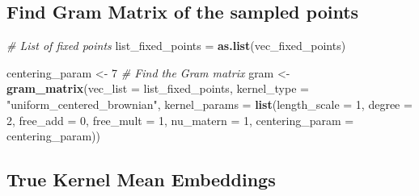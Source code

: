\documentclass[
]{article}
\newenvironment{Shaded}{\begin{snugshade}}{\end{snugshade}}
\newcommand{\AttributeTok}[1]{\textcolor[rgb]{0.13,0.29,0.53}{#1}}
\newcommand{\CommentTok}[1]{\textcolor[rgb]{0.56,0.35,0.01}{\textit{#1}}}
\newcommand{\DecValTok}[1]{\textcolor[rgb]{0.00,0.00,0.81}{#1}}
\newcommand{\FunctionTok}[1]{\textcolor[rgb]{0.13,0.29,0.53}{\textbf{#1}}}
\newcommand{\NormalTok}[1]{#1}
\newcommand{\OtherTok}[1]{\textcolor[rgb]{0.56,0.35,0.01}{#1}}
\newcommand{\StringTok}[1]{\textcolor[rgb]{0.31,0.60,0.02}{#1}}
\begin{document}
\subsection{Find Gram Matrix of the sampled
points}\label{find-gram-matrix-of-the-sampled-points}

\begin{Shaded}
\begin{Highlighting}[]
\CommentTok{\# List of fixed points}
\NormalTok{list\_fixed\_points }\OtherTok{=} \FunctionTok{as.list}\NormalTok{(vec\_fixed\_points)}

\NormalTok{centering\_param }\OtherTok{\textless{}{-}} \DecValTok{7}
\CommentTok{\# Find the Gram matrix}
\NormalTok{gram }\OtherTok{\textless{}{-}} \FunctionTok{gram\_matrix}\NormalTok{(}\AttributeTok{vec\_list =}\NormalTok{ list\_fixed\_points, }
                    \AttributeTok{kernel\_type =} \StringTok{"uniform\_centered\_brownian"}\NormalTok{,}
                    \AttributeTok{kernel\_params =} \FunctionTok{list}\NormalTok{(}\AttributeTok{length\_scale =} \DecValTok{1}\NormalTok{, }\AttributeTok{degree =} \DecValTok{2}\NormalTok{,}
                                             \AttributeTok{free\_add =} \DecValTok{0}\NormalTok{, }\AttributeTok{free\_mult =} \DecValTok{1}\NormalTok{,}
                                             \AttributeTok{nu\_matern =} \DecValTok{1}\NormalTok{, }\AttributeTok{centering\_param =}\NormalTok{ centering\_param))}
\end{Highlighting}
\end{Shaded}

\subsection{True Kernel Mean
Embeddings}\label{true-kernel-mean-embeddings}
\end{document}
